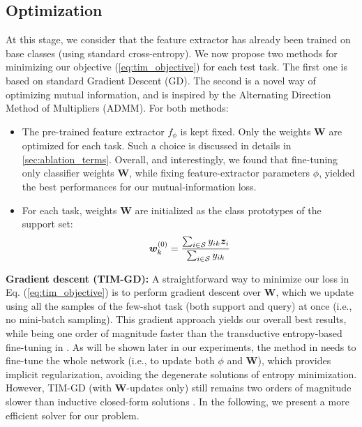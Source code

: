 \documentclass{article}
\begin{document}
    	\subsection{Optimization}\label{sec:optim}
            At this stage, we consider that the feature extractor has already been trained on base classes (using standard cross-entropy). We now propose two methods for minimizing our objective (\ref{eq:tim_objective}) for each test task. The first one is based on standard Gradient Descent (GD). The second is a novel way of optimizing mutual information, and is inspired by the Alternating Direction Method of Multipliers (ADMM). For both methods:
            \begin{itemize}
                \item The pre-trained feature extractor $f_\phi$ is kept fixed. Only the weights $\mathbf{W}$ are optimized for each task. Such a choice is discussed in details in \autoref{sec:ablation_terms}. Overall, and interestingly, we found that fine-tuning only classifier weights $\mathbf{W}$, while fixing feature-extractor parameters $\phi$, yielded the best performances for our mutual-information loss.
\item For each task, weights $\mathbf{W}$ are initialized as the class prototypes of the support set: 
                \begin{align*}
                    \bm{w}_k^{(0)}= \frac{\sum_{i \in \mathcal{S}}y_{ik} \bm{z}_i}{\sum_{i \in \mathcal{S}}y_{ik}}
                \end{align*}
            \end{itemize}
            
    
            \textbf{Gradient descent (TIM-GD):} A straightforward way to minimize our loss in Eq. (\ref{eq:tim_objective}) is to perform gradient descent over $\mathbf{W}$, which 
we  update using all the samples of the few-shot task (both support and query) at once (i.e., no mini-batch sampling). This gradient approach yields our overall best results, while being one order of magnitude faster than the transductive entropy-based fine-tuning in \cite{dhillon2019baseline}. As will be shown later in our experiments, the method in \cite{dhillon2019baseline} needs to fine-tune the whole network (i.e., to update both $\phi$ and $\mathbf{W}$), which provides implicit regularization, avoiding the degenerate solutions of entropy minimization. However, TIM-GD (with $\mathbf{W}$-updates only) still remains two orders of magnitude slower than inductive closed-form solutions \cite{prototypical_nets}. In the following, we present a more efficient solver for our problem.
            
\end{document}
